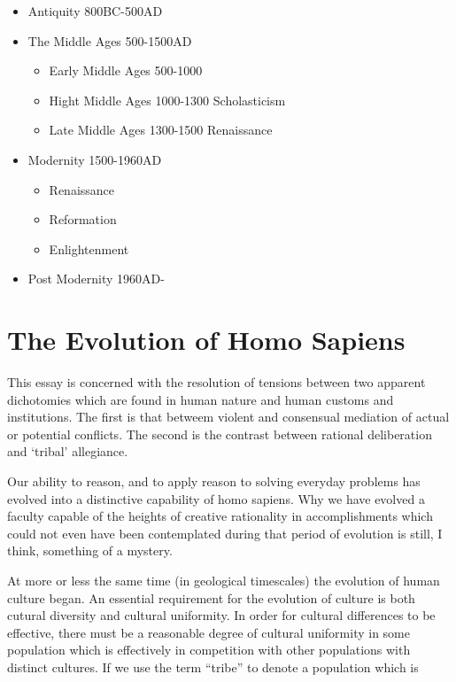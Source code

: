 \documentclass[10pt,titlepage]{article}
\begin{document}
\begin{itemize}
\item Antiquity 800BC-500AD
\item The Middle Ages 500-1500AD
    \begin{itemize}
  \item Early Middle Ages 500-1000
  \item Hight Middle Ages 1000-1300 Scholasticism
  \item Late Middle Ages 1300-1500 Renaissance    
    \end{itemize}
\item Modernity 1500-1960AD
  \begin{itemize}
  \item Renaissance
  \item Reformation
  \item Enlightenment    
    \end{itemize}
\item Post Modernity 1960AD- 
\end{itemize}

\section{The Evolution of Homo Sapiens}

This essay is concerned with the resolution of tensions between two apparent dichotomies which are found in human nature and human customs and institutions.
The first is that betweem violent and consensual mediation of actual or potential conflicts.
The second is the contrast between rational deliberation and `tribal' allegiance.

Our ability to reason, and to apply reason to solving everyday problems has evolved into a distinctive capability of homo sapiens.
Why we have evolved a faculty capable of the heights of creative rationality in accomplishments which could not even have been contemplated during that period of evolution is still, I think, something of a mystery.

At more or less the same time (in geological timescales) the evolution of human culture began.
An essential requirement for the evolution of culture is both cutural diversity and cultural uniformity.
In order for cultural differences to be effective, there must be a reasonable degree of cultural uniformity in some population which is effectively in competition with other populations with distinct cultures.
If we use the term ``tribe'' to denote a population which is 
\end{document}
